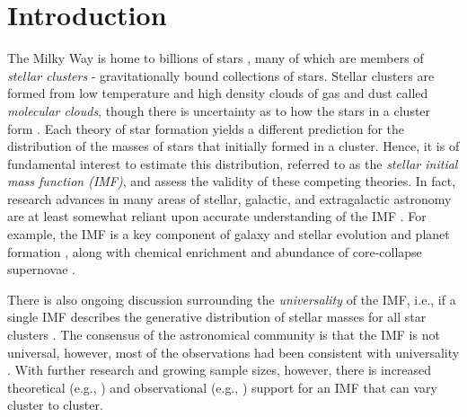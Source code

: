 \documentclass[12pt]{article}
\begin{document}
\section{Introduction}
\label{introSec}

The Milky Way is home to billions of stars \citep{McMillan:2016uq}, many of which 
are members of \emph{stellar clusters} - gravitationally bound collections of stars. 
Stellar clusters are formed from low temperature and high density clouds of gas and dust 
called \emph{molecular clouds}, though there 
is uncertainty as to how the stars in a cluster form \citep{Beccari2017}. 
Each theory of star formation yields a different prediction for the distribution
of the masses of stars that initially formed in a cluster. Hence, it is of fundamental 
interest to estimate this distribution, referred to as the \emph{stellar initial mass function (IMF)},
and assess the validity of these competing theories.
In fact, research advances in many areas of stellar, galactic, and extragalactic astronomy are at 
least somewhat reliant upon accurate understanding of the IMF \citep{bastian2010}.
For example, the IMF is a key
component of galaxy and stellar evolution and planet formation \citep{bally2005, bastian2010, Shetty2014}, 
along with chemical enrichment and abundance of core-collapse supernovae \citep{weisz13}.

There is also ongoing discussion surrounding the {\it universality} of the IMF, i.e.,
if a single IMF describes the generative distribution of stellar masses for all
star clusters \citep{bastian2010}. The consensus of the astronomical community is that the IMF is not universal, however, most of the observations had been consistent with universality \citep{kroupa2001, bastian2010, Ashworth2017}.
With further research and growing sample sizes, however, there is increased theoretical 
(e.g., \citealt{bonnell2006, Dib2010})
and observational
(e.g., \citealt{Treu2010, Dokkum:2010fk, Spiniello2014,Geha2013, Dib2017})
support for an IMF that can vary cluster to cluster. %
\end{document}
